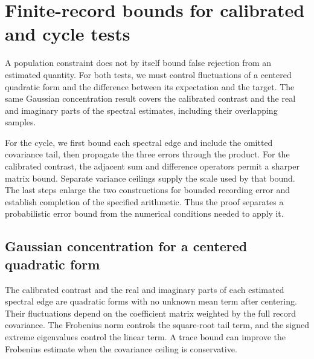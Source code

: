 \section{Finite-record bounds for calibrated and cycle tests}
\label{cc16:section}

A population constraint does not by itself bound false rejection from an estimated quantity. For both tests, we must control fluctuations of a centered quadratic form and the difference between its expectation and the target. The same Gaussian concentration result covers the calibrated contrast and the real and imaginary parts of the spectral estimates, including their overlapping samples.

For the cycle, we first bound each spectral edge and include the omitted covariance tail, then propagate the three errors through the product. For the calibrated contrast, the adjacent sum and difference operators permit a sharper matrix bound. Separate variance ceilings supply the scale used by that bound. The last steps enlarge the two constructions for bounded recording error and establish completion of the specified arithmetic. Thus the proof separates a probabilistic error bound from the numerical conditions needed to apply it.

\subsection{Gaussian concentration for a centered quadratic form}

The calibrated contrast and the real and imaginary parts of each estimated spectral edge are quadratic forms with no unknown mean term after centering. Their fluctuations depend on the coefficient matrix weighted by the full record covariance. The Frobenius norm controls the square-root tail term, and the signed extreme eigenvalues control the linear term. A trace bound can improve the Frobenius estimate when the covariance ceiling is conservative.

